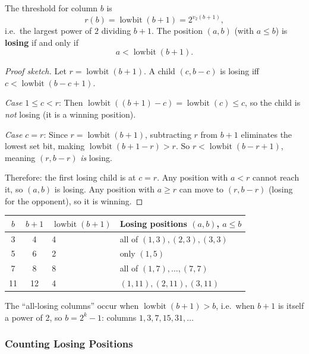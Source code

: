 \begin{theorem}
The threshold for column $b$ is
\[
r(b) = \operatorname{lowbit}(b+1) = 2^{v_2(b+1)},
\]
i.e.\ the largest power of $2$ dividing $b+1$. The position $(a,b)$ (with $a \le b$) is \textbf{losing} if and only if
\[
a < \operatorname{lowbit}(b+1).
\]
\end{theorem}

\begin{proof}[Proof sketch]
Let $r = \operatorname{lowbit}(b+1)$. A child $(c, b-c)$ is losing iff $c < \operatorname{lowbit}(b-c+1)$.

\emph{Case $1 \le c < r$}: Then $\operatorname{lowbit}((b+1)-c) = \operatorname{lowbit}(c) \le c$, so the child is \emph{not} losing (it is a winning position).

\emph{Case $c = r$}: Since $r = \operatorname{lowbit}(b+1)$, subtracting $r$ from $b+1$ eliminates the lowest set bit, making $\operatorname{lowbit}(b+1-r) > r$. So $r < \operatorname{lowbit}(b-r+1)$, meaning $(r, b-r)$ \emph{is} losing.

Therefore: the first losing child is at $c = r$. Any position with $a < r$ cannot reach it, so $(a,b)$ is losing. Any position with $a \ge r$ can move to $(r, b-r)$ (losing for the opponent), so it is winning.
\end{proof}

\begin{example}
\begin{center}
\begin{tabular}{ccll}
$b$ & $b+1$ & $\operatorname{lowbit}(b+1)$ & Losing positions $(a,b)$, $a \le b$ \\
\hline
3 & 4 & 4 & all of $(1,3),(2,3),(3,3)$ \\
5 & 6 & 2 & only $(1,5)$ \\
7 & 8 & 8 & all of $(1,7),\ldots,(7,7)$ \\
11 & 12 & 4 & $(1,11),(2,11),(3,11)$ \\
\end{tabular}
\end{center}
The ``all-losing columns'' occur when $\operatorname{lowbit}(b+1) > b$, i.e.\ when $b+1$ is itself a power of 2, so $b = 2^k - 1$: columns $1, 3, 7, 15, 31, \ldots$
\end{example}

\subsubsection*{Counting Losing Positions}

